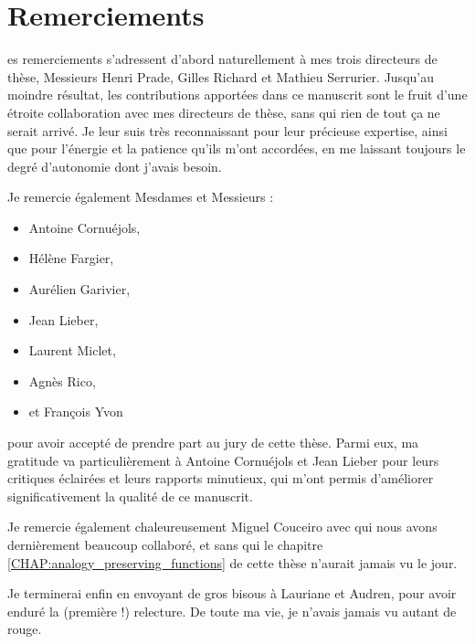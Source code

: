 \chapter*{Remerciements}
es remerciements s'adressent d'abord naturellement à mes trois
directeurs de thèse, Messieurs Henri Prade, Gilles Richard et Mathieu
Serrurier. Jusqu'au moindre résultat, les contributions apportées dans ce
manuscrit sont le fruit d'une étroite collaboration avec mes directeurs de
thèse, sans qui rien de tout ça ne serait arrivé. Je leur suis très
reconnaissant pour leur précieuse expertise, ainsi que pour l'énergie et la
patience qu'ils m'ont accordées, en me laissant toujours le degré d'autonomie
dont j'avais besoin.

Je remercie également Mesdames et Messieurs :
\begin{itemize}
  \item Antoine Cornuéjols,
  \item Hélène Fargier,
  \item Aurélien Garivier,
  \item Jean Lieber,
  \item Laurent Miclet,
  \item Agnès Rico,
  \item et François Yvon
\end{itemize}
pour avoir accepté de prendre part au jury de cette thèse. Parmi eux, ma
gratitude va particulièrement à Antoine Cornuéjols et Jean Lieber pour leurs
critiques éclairées et leurs rapports minutieux, qui m'ont permis d'améliorer
significativement la qualité de ce manuscrit.

Je remercie également chaleureusement Miguel Couceiro avec qui nous avons
dernièrement beaucoup collaboré, et sans qui le chapitre
\ref{CHAP:analogy_preserving_functions} de cette thèse n'aurait jamais vu le
jour.

Je terminerai enfin en envoyant de gros bisous à Lauriane et Audren, pour avoir
enduré la (première !) relecture. De toute ma vie, je n'avais jamais vu autant
de rouge.
